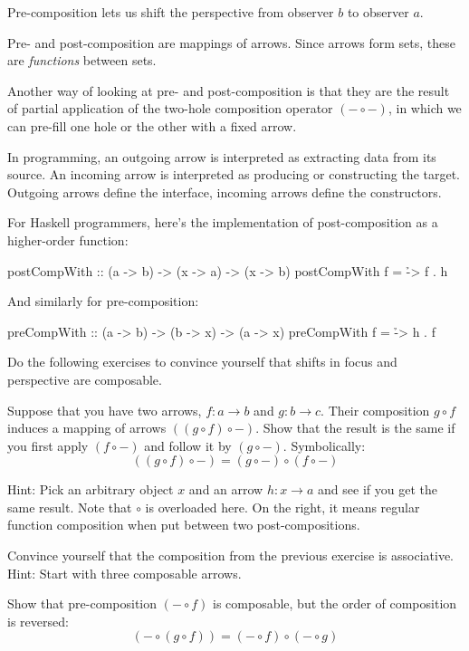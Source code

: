 \documentclass[DaoFP]{subfiles}
\begin{document}
Pre-composition lets us shift the perspective from observer $b$ to observer $a$.

Pre- and post-composition are mappings of arrows. Since arrows form sets, these are \emph{functions} between sets. 

Another way of looking at pre- and post-composition is that they are the result of partial application of the two-hole composition operator $(- \circ -)$, in which we can pre-fill one hole or the other with a fixed arrow.

In programming, an outgoing arrow is interpreted as extracting data from its source. An incoming arrow is interpreted as producing or constructing the target. Outgoing arrows define the interface, incoming arrows define the constructors.

For Haskell programmers, here's the implementation of post-composition as a higher-order function:
\begin{haskell}
postCompWith :: (a -> b) -> (x -> a) -> (x -> b)
postCompWith f = \h -> f . h
\end{haskell}
And similarly for pre-composition:
\begin{haskell}
preCompWith :: (a -> b) -> (b -> x) -> (a -> x)
preCompWith f = \h -> h . f
\end{haskell}

Do the following exercises to convince yourself that shifts in focus and perspective are composable.
\begin{exercise}\label{ex-yoneda-composition}
Suppose that you have two arrows, $f \colon a \to b$ and $g \colon b \to c$. Their composition $g \circ f$ induces a mapping of arrows $((g \circ f) \circ -)$. Show that the result is the same if you first apply $(f \circ -)$ and follow it by $(g \circ -)$. Symbolically:
\[((g \circ f) \circ -) = (g \circ -) \circ (f \circ -)\]

Hint: Pick an arbitrary object $x$ and an arrow $h \colon x \to a$ and see if you get the same result. Note that $\circ$ is overloaded here. On the right, it means regular function composition when put between two post-compositions.
\end{exercise}

\begin{exercise}
Convince yourself that the composition from the previous exercise is associative. Hint: Start with three composable arrows.
\end{exercise}

\begin{exercise}
Show that pre-composition $(- \circ f)$ is composable, but the order of composition is reversed:
\[(- \circ (g \circ f)) = (- \circ f) \circ (- \circ g) \]
\end{exercise}
\end{document}

